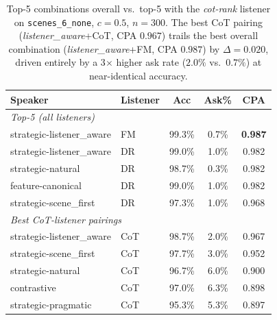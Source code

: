 \begin{table}[ht]
\centering
\small
\setlength{\tabcolsep}{4pt}
\begin{tabular}{llccc}
\toprule
Speaker & Listener & Acc & Ask\% & CPA \\
\midrule
\multicolumn{5}{l}{\textit{Top-5 (all listeners)}} \\
strategic-listener\_aware & FM  & 99.3\% & 0.7\%  & \textbf{0.987} \\
strategic-listener\_aware & DR  & 99.0\% & 1.0\%  & 0.982 \\
strategic-natural         & DR  & 98.7\% & 0.3\%  & 0.982 \\
feature-canonical         & DR  & 99.0\% & 1.0\%  & 0.982 \\
strategic-scene\_first    & DR  & 97.3\% & 1.0\%  & 0.968 \\
\midrule
\multicolumn{5}{l}{\textit{Best CoT-listener pairings}} \\
strategic-listener\_aware & CoT & 98.7\% & 2.0\%  & 0.967 \\
strategic-scene\_first    & CoT & 97.7\% & 3.0\%  & 0.952 \\
strategic-natural         & CoT & 96.7\% & 6.0\%  & 0.900 \\
contrastive               & CoT & 97.0\% & 6.3\%  & 0.898 \\
strategic-pragmatic       & CoT & 95.3\% & 5.3\%  & 0.897 \\
\bottomrule
\end{tabular}
\caption{Top-5 combinations overall vs.\ top-5 with the
         \textit{cot-rank} listener on \texttt{scenes\_6\_none},
         $c{=}0.5$, $n{=}300$.  The best CoT pairing
         (\textit{listener\_aware}+CoT, CPA $0.967$) trails the best
         overall combination (\textit{listener\_aware}+FM, CPA $0.987$)
         by $\Delta{=}0.020$, driven entirely by a 3$\times$ higher ask
         rate ($2.0\%$ vs.\ $0.7\%$) at near-identical accuracy.}
\label{tab:rerun_top5_vs_cot}
\end{table}

